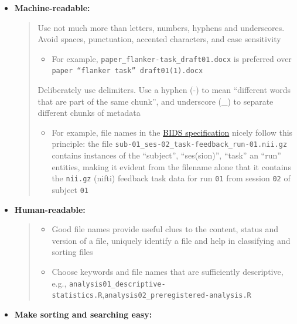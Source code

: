 \documentclass[
  letterpaper,
  DIV=11,
  numbers=noendperiod]{scrreprt}
\providecommand{\tightlist}{%
  \setlength{\itemsep}{0pt}\setlength{\parskip}{0pt}}
\begin{document}
\begin{itemize}
\item
  \textbf{Machine-readable:}

  \label{naming-conventions-1}
  \begin{quote}
  Use not much more than letters, numbers, hyphens and underscores.
  Avoid spaces, punctuation, accented characters, and case sensitivity

  \begin{itemize}
  \tightlist
  \item
    For example, \texttt{paper\_flanker-task\_draft01.docx} is preferred
    over \texttt{paper\ “flanker\ task”\ draft01(1).docx}
  \end{itemize}

  Deliberately use delimiters. Use a hyphen (-) to mean ``different
  words that are part of the same chunk'', and underscore (\_) to
  separate different chunks of metadata

  \begin{itemize}
  \tightlist
  \item
    For example, file names in the
    \href{https://bids.neuroimaging.io/}{BIDS specification} nicely
    follow this principle: the file
    \texttt{sub-01\_ses-02\_task-feedback\_run-01.nii.gz} contains
    instances of the ``subject'', ``ses(sion)'', ``task'' an ``run''
    entities, making it evident from the filename alone that it contains
    the \texttt{nii.gz} (nifti) feedback task data for run \texttt{01}
    from session \texttt{02} of subject \texttt{01}
  \end{itemize}
  \end{quote}
\item
  \textbf{Human-readable:}

  \label{naming-conventions-2}
  \begin{quote}
  \begin{itemize}
  \item
    Good file names provide useful clues to the content, status and
    version of a file, uniquely identify a file and help in classifying
    and sorting files
  \item
    Choose keywords and file names that are sufficiently descriptive,
    e.g.,
    \texttt{analysis01\_descriptive-statistics.R},\texttt{analysis02\_preregistered-analysis.R}
  \end{itemize}
  \end{quote}
\item
  \textbf{Make sorting and searching easy:}


\end{itemize}
\end{document}
